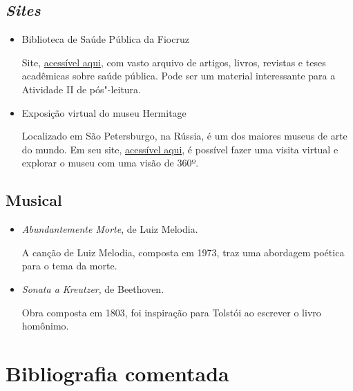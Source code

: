 \documentclass[12pt]{extarticle}
\begin{document}
\subsection{\emph{Sites}}

\begin{itemize}

\item Biblioteca de Saúde Pública da Fiocruz

Site, \href{http://www.fiocruz.br/bibsp/cgi/cgilua.exe/sys/start.htm?sid=107}{acessível aqui}, com vasto arquivo de artigos, livros, revistas e teses acadêmicas 
sobre saúde pública. Pode ser um material interessante 
para a Atividade II de pós"-leitura.

\item Exposição virtual do museu Hermitage

Localizado em São Petersburgo, na Rússia, é um dos maiores museus de arte do mundo. Em seu site, \href{https://www.hermitagemuseum.org/wps/portal/hermitage/panorama/virtual_visit/panoramas-m-1/}{acessível aqui}, é possível fazer uma visita virtual e explorar o museu com uma visão de 360º.
\end{itemize}

\subsection {Musical}

\begin{itemize}
\item \emph{Abundantemente Morte}, de Luiz Melodia.

A canção de Luiz Melodia, composta em 1973, traz uma abordagem poética para o tema da morte.

\item \emph{Sonata a Kreutzer}, de Beethoven.

Obra composta em 1803, foi inspiração para Tolstói ao escrever o livro homônimo.
\end{itemize}

\section{Bibliografia comentada}
\end{document}
